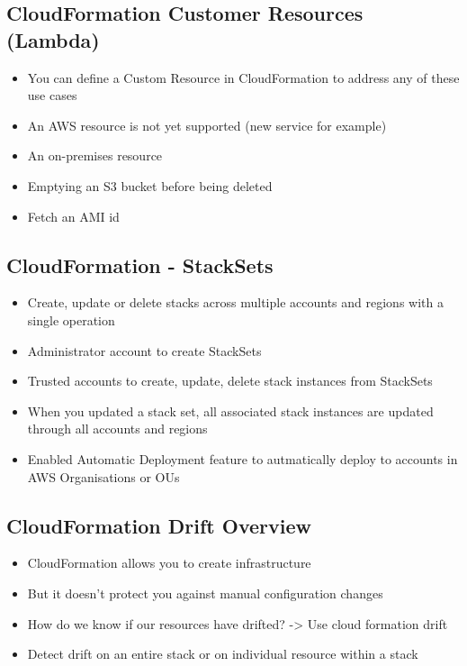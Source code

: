 \subsection{CloudFormation Customer Resources (Lambda)}
\begin{itemize}
    \item You can define a Custom Resource in CloudFormation to address any of these use cases
    \item An AWS resource is not yet supported (new service for example)
    \item An on-premises resource
    \item Emptying an S3 bucket before being deleted
    \item Fetch an AMI id
\end{itemize}

\subsection{CloudFormation - StackSets}
\begin{itemize}
    \item Create, update or delete stacks across multiple accounts and regions with a single operation
    \item Administrator account to create StackSets
    \item Trusted accounts to create, update, delete stack instances from StackSets
    \item When you updated a stack set, all associated stack instances are updated through all accounts and regions
    \item Enabled Automatic Deployment feature to autmatically deploy to accounts in AWS Organisations or OUs
\end{itemize}

\subsection{CloudFormation Drift Overview}
\begin{itemize}
    \item CloudFormation allows you to create infrastructure
    \item But it doesn't protect you against manual configuration changes
    \item How do we know if our resources have drifted? -> Use cloud formation drift
    \item Detect drift on an entire stack or on individual resource within a stack
\end{itemize}

